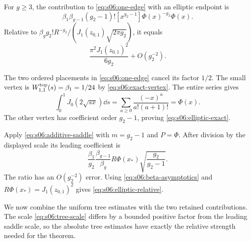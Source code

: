 \begin{lmm}\label{lmm:s06:elliptic-leaf}
For $g\geq3$, the contribution to \eqref{eq:s06:one-edge} with
an elliptic endpoint is
\begin{equation}\label{eq:s06:elliptic-exact}
 \beta_1\beta_{g-1}(g_2-1)!
 [x^{g_2-1}]\Phi(x)^{-g_2}\Phi(x).
\end{equation}
Relative to
$\beta_g g_2!R^{-g_2}/(J_1(z_{0,1})\sqrt{2\pi g_2})$,
it equals
\begin{equation}\label{eq:s06:elliptic-relative}
 \frac{\pi^2J_1(z_{0,1})^2}{6g_2}+O(g_2^{-2}).
\end{equation}
\end{lmm}
\begin{prf}
The two ordered placements in \eqref{eq:s06:one-edge} cancel
its factor $1/2$. The small vertex is
$W^{\rm top}_{1,1}(s)=\beta_1=1/24$ by
\eqref{eq:s06:exact-vertex}. The entire series gives
\[
 \int_0^1J_0(2\sqrt{s x})\dd s
    =\sum_{a\geq0}\frac{(-x)^a}{a!(a+1)!}=\Phi(x).
\]
The other vertex has coefficient order $g_2-1$, proving
\eqref{eq:s06:elliptic-exact}.

Apply \eqref{eq:s06:additive-saddle} with $m=g_2-1$ and
$P=\Phi$. After division by the displayed scale its leading
coefficient is
\[
 \frac{\beta_1}{g_2}\frac{\beta_{g-1}}{\beta_g}
     R\Phi(x_*)\sqrt{\frac{g_2}{g_2-1}}.
\]
The ratio has an $O(g_2^{-2})$ error. Using
\eqref{eq:s06:beta-asymptotics} and
$R\Phi(x_*)=J_1(z_{0,1})^2$ gives
\eqref{eq:s06:elliptic-relative}.
\end{prf}

We now combine the uniform tree estimates with the two retained
contributions. The scale \eqref{eq:s06:tree-scale} differs by a
bounded positive factor from the leading saddle scale, so the
absolute tree estimates have exactly the relative strength needed
for the theorem.

